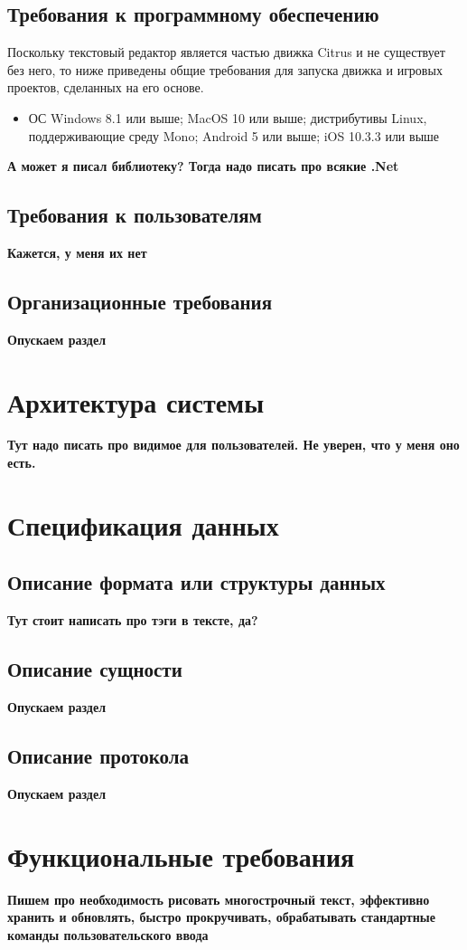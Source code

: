 \documentclass{fefu}
\begin{document}
		\subsection{Требования к программному обеспечению}
			\par Поскольку текстовый редактор является частью движка Citrus и не существует 
			без него, то ниже приведены общие требования для запуска движка и игровых проектов,
			сделанных на его основе.
			\begin{itemize}
				\item ОС Windows 8.1 или выше; MacOS 10 или выше; дистрибутивы 
				Linux, поддерживающие среду Mono; Android 5 или выше; iOS 10.3.3 или выше
			\end{itemize}
			\textbf{А может я писал библиотеку? Тогда надо писать про всякие .Net}
		\subsection{Требования к пользователям}
			\textbf{Кажется, у меня их нет}
		\subsection{Организационные требования}
			\textbf{Опускаем раздел}
	\section{Архитектура системы}
		\par \textbf{Тут надо писать про видимое для пользователей. Не уверен, что у меня оно
		есть.}
	\section{Спецификация данных}
		\subsection{Описание формата или структуры данных}
			\textbf{Тут стоит написать про тэги в тексте, да?}
		\subsection{Описание сущности}
			\textbf{Опускаем раздел}
		\subsection{Описание протокола}
			\textbf{Опускаем раздел}
	\section{Функциональные требования}
		\par\textbf{Пишем про необходимость рисовать многострочный текст, эффективно хранить
		и обновлять, быстро прокручивать, обрабатывать стандартные команды пользовательского
		ввода}
\end{document}
